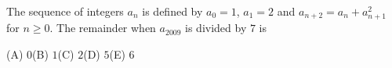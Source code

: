 The sequence of integers $a_n$ is defined by $a_0=1$, $a_1=2$ and $a_{n+2}=a_n+a_{n+1}^2$ for $n\ge0$. The remainder when $a_{2009}$ is divided by $7$ is

(A) $0$\quad (B) $1$\quad (C) $2$\quad (D) $5$\quad (E) $6$
